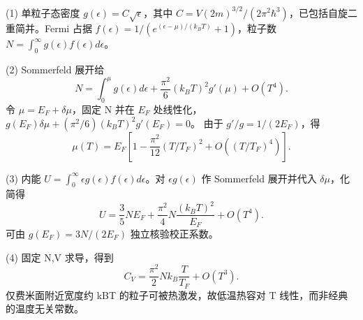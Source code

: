 (1) 单粒子态密度 \(g(\epsilon)=C\sqrt\epsilon\)，其中 \(C=V(2m)^{3/2}/(2\pi^2\hbar^3)\)，已包括自旋二重简并。Fermi 占据 \(f(\epsilon)=1/(e^{(\epsilon-\mu)/(k_BT)}+1)\)，粒子数 \(N=\int_0^\infty g(\epsilon)f(\epsilon)d\epsilon\)。

(2) Sommerfeld 展开给
\[
N=\int_0^\mu g(\epsilon)d\epsilon
+\frac{\pi^2}{6}(k_BT)^2g'(\mu)+O(T^4).
\]
令 \(\mu=E_F+\delta\mu\)，固定 N 并在 \(E_F\) 处线性化，
\(g(E_F)\delta\mu+(\pi^2/6)(k_BT)^2g'(E_F)=0\)。
由于 \(g'/g=1/(2E_F)\)，得
\[
\mu(T)=E_F\left[1-\frac{\pi^2}{12}(T/T_F)^2+O((T/T_F)^4)\right].
\]

(3) 内能 \(U=\int_0^\infty \epsilon g(\epsilon)f(\epsilon)d\epsilon\)。对 \(\epsilon g(\epsilon)\) 作 Sommerfeld 展开并代入 \(\delta\mu\)，化简得
\[
U=\frac35NE_F+\frac{\pi^2}{4}N\frac{(k_BT)^2}{E_F}+O(T^4).
\]
可由 \(g(E_F)=3N/(2E_F)\) 独立核验校正系数。

(4) 固定 N,V 求导，得到
\[
C_V=\frac{\pi^2}{2}Nk_B\frac{T}{T_F}+O(T^3).
\]
仅费米面附近宽度约 kBT 的粒子可被热激发，故低温热容对 T 线性，而非经典的温度无关常数。
